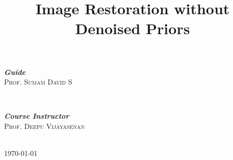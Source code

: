 \documentclass[journal]{IEEEtran} %
\begin{document}
\begin{titlepage}
\begin{minipage}{0.4\textwidth}
\begin{flushleft} \large
    \emph{\textbf{Guide}}\\
    \textsc{Prof. Sumam David S} \\
\end{flushleft}
\end{minipage}
~
\begin{minipage}{0.4\textwidth}
\begin{flushright} \large
    \emph{\textbf{Course Instructor}}\\
    \textsc{Prof. Deepu Vijayasenan} \\
\end{flushright}
\end{minipage}\\[2cm]





{\large \today}\\[2cm] 



\vfill 

\end{titlepage}




\onecolumn
\vfill 
\begin{center}
\vspace*{\fill}
   \begin{minipage}{0.6\textwidth}
        \tableofcontents
    \end{minipage} 
\vspace*{\fill}
\end{center}

    


\twocolumn
\title{Image Restoration without Denoised Priors\\
}



\maketitle
\begin{abstract}
    
    
\end{abstract}
\end{document}
